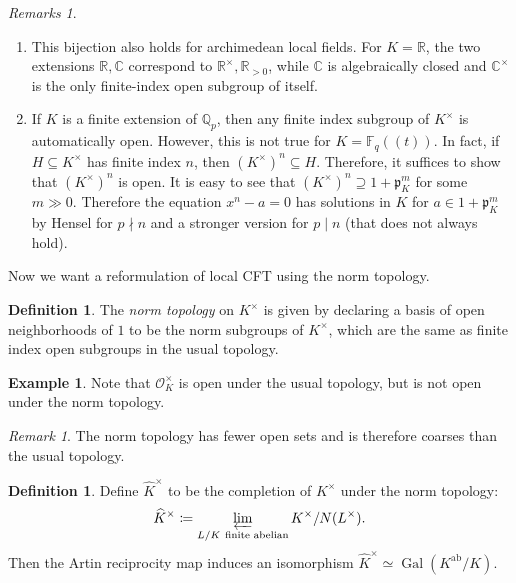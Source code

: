 \documentclass[leqno, openany]{memoir}
\theoremstyle{definition}
\newtheorem{defn}[thm]{Definition}
\newtheorem{exm}[thm]{Example}
\theoremstyle{remark}
\newtheorem{rmk}[thm]{Remark}
\newtheorem{rmks}[thm]{Remarks}
\theoremstyle{plain}
\theoremstyle{definition}
\theoremstyle{remark}
\newcommand{\R}{\mathbb{R}}
\newcommand{\F}{\mathbb{F}}
\newcommand{\C}{\mathbb{C}}
\newcommand{\Q}{\mathbb{Q}}
\newcommand{\mc}[1]{\mathcal{#1}}
\newcommand{\mf}[1]{\mathfrak{#1}}
\newcommand{\mr}[1]{\mathrm{#1}}
\newcommand{\wh}[1]{\widehat{#1}}
\DeclareMathOperator{\Gal}{Gal}
\begin{document}
\begin{rmks}\leavevmode \begin{enumerate} \item This bijection also holds for
    archimedean local fields. For $K = \R$, the two extensions $\R, \C$
    correspond to $\R^{\times}, \R_{>0}$, while $\C$ is algebraically closed
    and $\C^{\times}$ is the only finite-index open subgroup of itself.  \item
    If $K$ is a finite extension of $\Q_p$, then any finite index subgroup of
    $K^{\times}$ is automatically open. However, this is not true for $K =
    \F_q((t))$. In fact, if $H \subseteq K^{\times}$ has finite index $n$, then
    ${(K^{\times})}^n \subseteq H$. Therefore, it suffices to show that
    ${(K^{\times})}^n$ is open. It is easy to see that ${(K^{\times})}^n
    \supseteq 1 + \mf{p}_K^m$ for some $m \gg 0$. Therefore the equation $x^n -
    a = 0$ has solutions in $K$ for $a \in 1 + \mf{p}_K^m$ by Hensel for $p
    \nmid n$ and a stronger version for $p \mid n$ (that does not always hold).
    \end{enumerate} \end{rmks}

Now we want a reformulation of local CFT using the norm topology.

\begin{defn} The \textit{norm topology} on $K^{\times}$ is given by declaring a
basis of open neighborhoods of $1$ to be the norm subgroups of $K^{\times}$,
which are the same as finite index open subgroups in the usual topology.
\end{defn}

\begin{exm} Note that $\mc{O}_K^{\times}$ is open under the usual topology, but
is not open under the norm topology.  \end{exm}

\begin{rmk} The norm topology has fewer open sets and is therefore coarses than
the usual topology.  \end{rmk}

\begin{defn} Define $\wh{K}^{\times}$ to be the completion of $K^{\times}$
    under the norm topology: \[ \wh{K}^{\times} \coloneqq \varprojlim_{L/K\
    \text{finite abelian}} K^{\times}/N(L^{\times}). \] Then the Artin
    reciprocity map induces an isomorphism $\wh{K}^{\times} \simeq
    \Gal(K^{\mr{ab}}/K)$.  \end{defn}
\end{document}
